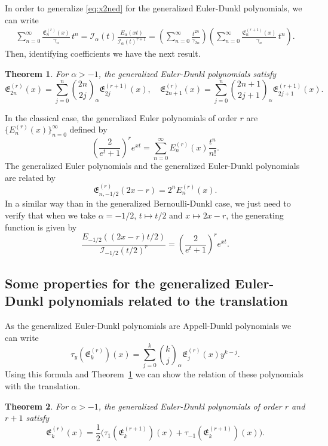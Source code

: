 \documentclass[10pt]{article}
\theoremstyle{plain}
\newtheorem{theorem}{Theorem}[section]
\theoremstyle{definition}
\numberwithin{equation}{section} %
\newcommand{\Ea}{E_{\alpha}}
\newcommand{\binoma}[2]{\binom{#1}{#2}_{\!\alpha}}
\newcommand{\I}{\mathcal{I}}
\newcommand{\E}{\mathfrak{E}}
\newcommand{\cc}{\gamma}
\begin{document}
In order to generalize \eqref{eq:x2ned} for the generalized Euler-Dunkl polynomials, we can write
\begin{align*}
  \sum_{n=0}^{\infty} \frac{\E_{n}^{(r)}(x)}{\cc_n} \,t^n
  = \I_{\alpha}(t) \frac{\Ea(xt)}{\I_{\alpha}(t)^{r+1}} 
  = \left(\sum_{n=0}^{\infty}\frac{t^{2n}}{\cc_{2n}}\right) 
  \left(\sum_{n=0}^{\infty}\frac{\E_n^{(r+1)}(x)}{\cc_n}\,t^n\right).
\end{align*}
Then, identifying coefficients we have the next result.

\begin{theorem} 
\label{teo:x2nedr}
For $\alpha>-1$, the generalized Euler-Dunkl polynomials satisfy
\begin{equation*}
  \E_{2n}^{(r)}(x) = \sum_{j=0}^n\binoma{2n}{2j}\E_{2j}^{(r+1)}(x),
\quad
  \E_{2n+1}^{(r)}(x) = \sum_{j=0}^n\binoma{2n+1}{2j+1}\E_{2j+1}^{(r+1)}(x).
\end{equation*}
\end{theorem}

In the classical case, the generalized Euler polynomials of order $r$ are $\{E_{n}^{(r)}(x)\}_{n=0}^\infty$ defined by
\[
  \left(\frac{2}{e^t+1}\right)^r e^{xt} 
  = \sum_{n=0}^\infty E_{n}^{(r)}(x) \frac{t^n}{n!}.
\]
The generalized Euler polynomials and the generalized Euler-Dunkl polynomials are related by
\[
  \E_{n,-1/2}^{(r)}(2x-r) = 2^n E_n^{(r)}(x).
\]
In a similar way than in the generalized Bernoulli-Dunkl case, we just need to verify that when we take $\alpha=-1/2$, $t\mapsto t/2$ and $x\mapsto 2x-r$, the generating function is given by
\[
  \frac{E_{-1/2}((2x-r)t/2)}{\I_{-1/2}(t/2)^r} = \left(\frac{2}{e^t+1}\right)^r e^{xt}.
\]


\subsection{Some properties for the generalized Euler-Dunkl polynomials related to the translation}


As the generalized Euler-Dunkl polynomials are Appell-Dunkl polynomials we can write
\begin{equation*}
  \tau_y(\E_k^{(r)})(x) = \sum_{j=0}^k\binoma{k}{j}\E_{j}^{(r)}(x)y^{k-j}.
\end{equation*}
Using this formula and Theorem~\ref{teo:x2nedr} we can show the relation of these polynomials with the translation.

\begin{theorem}
For $\alpha>-1$, the generalized Euler-Dunkl polynomials of order $r$ and $r+1$ satisfy
\begin{equation*}
  \E_k^{(r)}(x) = \frac{1}{2} \big(\tau_1(\E_k^{(r+1)})(x)+\tau_{-1}(\E_k^{(r+1)})(x)\big).
\end{equation*}
\end{theorem}
\end{document}
